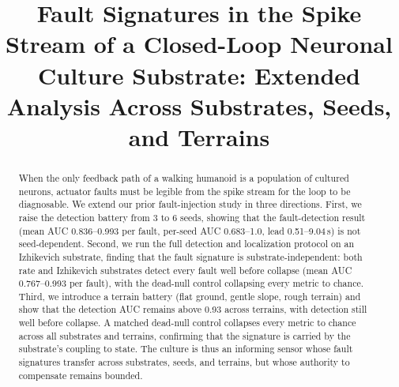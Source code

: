 
\usepackage{cite}
\usepackage{amsmath,amsfonts,amssymb}
\usepackage{graphicx}
\usepackage{textcomp}
\usepackage{booktabs}
\usepackage{array}
\usepackage{multirow}
\usepackage{url}
\usepackage[margin=0.75in, top=1in]{geometry}

\title{Fault Signatures in the Spike Stream of a Closed-Loop Neuronal
Culture Substrate: Extended Analysis Across Substrates, Seeds, and Terrains}

\AuthorsBlock



\maketitle

\begin{abstract}
When the only feedback path of a walking humanoid is a population of cultured
neurons, actuator faults must be legible from the spike stream for the loop to
be diagnosable. We extend our prior fault-injection study in three directions.
First, we raise the detection battery from 3 to 6 seeds, showing that the
fault-detection result (mean AUC 0.836--0.993 per fault, per-seed AUC
0.683--1.0, lead 0.51--9.04\,s) is not seed-dependent.
Second, we run the full detection and localization protocol on an Izhikevich
substrate, finding that the fault signature is substrate-independent: both rate
and Izhikevich substrates detect every fault well before collapse (mean AUC
0.767--0.993 per fault), with the dead-null control collapsing every metric to
chance. Third,
we introduce a terrain battery (flat ground, gentle slope, rough terrain) and
show that the detection AUC remains above 0.93 across terrains, with detection
still well before collapse. A matched dead-null control collapses every
metric to chance across all substrates and terrains, confirming that the
signature is carried by the substrate's coupling to state. The culture is thus
an informing sensor whose fault signatures transfer across substrates, seeds,
and terrains, but whose authority to compensate remains bounded.
\end{abstract}

